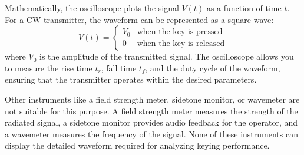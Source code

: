 Mathematically, the oscilloscope plots the signal \( V(t) \) as a function of time \( t \). For a CW transmitter, the waveform can be represented as a square wave:
\[
V(t) = 
\begin{cases} 
V_0 & \text{when the key is pressed} \\
0 & \text{when the key is released}
\end{cases}
\]
where \( V_0 \) is the amplitude of the transmitted signal. The oscilloscope allows you to measure the rise time \( t_r \), fall time \( t_f \), and the duty cycle of the waveform, ensuring that the transmitter operates within the desired parameters.

Other instruments like a field strength meter, sidetone monitor, or wavemeter are not suitable for this purpose. A field strength meter measures the strength of the radiated signal, a sidetone monitor provides audio feedback for the operator, and a wavemeter measures the frequency of the signal. None of these instruments can display the detailed waveform required for analyzing keying performance.

